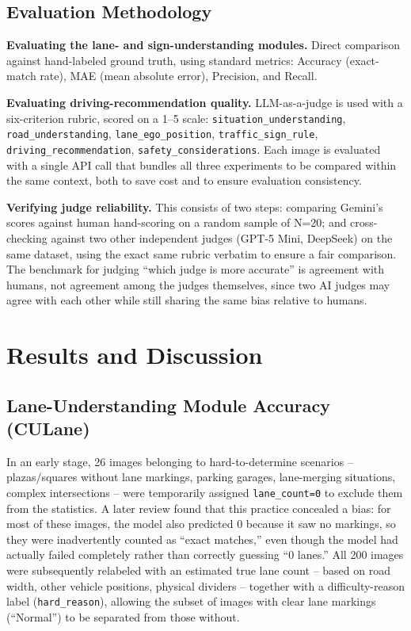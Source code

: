 \documentclass[12pt,a4paper]{report}
\begin{document}
\section{Evaluation Methodology}

\textbf{Evaluating the lane- and sign-understanding modules.} Direct comparison against hand-labeled ground truth, using standard metrics: Accuracy (exact-match rate), MAE (mean absolute error), Precision, and Recall.

\textbf{Evaluating driving-recommendation quality.} LLM-as-a-judge is used with a six-criterion rubric, scored on a 1--5 scale: \texttt{situation\_understanding}, \texttt{road\_understanding}, \texttt{lane\_ego\_position}, \texttt{traffic\_sign\_rule}, \texttt{driving\_recommendation}, \texttt{safety\_considerations}. Each image is evaluated with a single API call that bundles all three experiments to be compared within the same context, both to save cost and to ensure evaluation consistency.

\textbf{Verifying judge reliability.} This consists of two steps: comparing Gemini's scores against human hand-scoring on a random sample of N=20; and cross-checking against two other independent judges (GPT-5 Mini, DeepSeek) on the same dataset, using the exact same rubric verbatim to ensure a fair comparison. The benchmark for judging ``which judge is more accurate'' is agreement with humans, not agreement among the judges themselves, since two AI judges may agree with each other while still sharing the same bias relative to humans.

\chapter{Results and Discussion}

\section{Lane-Understanding Module Accuracy (CULane)}

In an early stage, 26 images belonging to hard-to-determine scenarios -- plazas/squares without lane markings, parking garages, lane-merging situations, complex intersections -- were temporarily assigned \texttt{lane\_count=0} to exclude them from the statistics. A later review found that this practice concealed a bias: for most of these images, the model also predicted 0 because it saw no markings, so they were inadvertently counted as ``exact matches,'' even though the model had actually failed completely rather than correctly guessing ``0 lanes.'' All 200 images were subsequently relabeled with an estimated true lane count -- based on road width, other vehicle positions, physical dividers -- together with a difficulty-reason label (\texttt{hard\_reason}), allowing the subset of images with clear lane markings (``Normal'') to be separated from those without.
\end{document}

